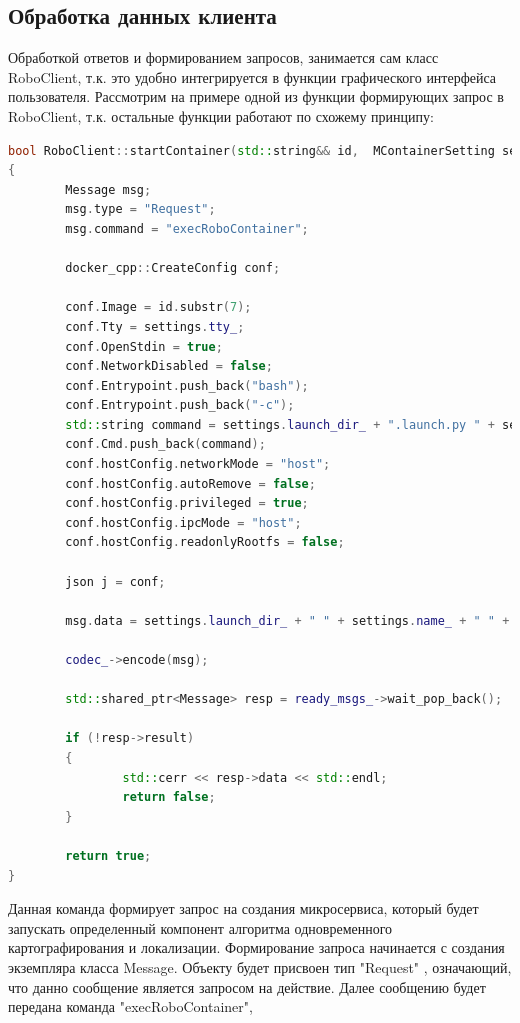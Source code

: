 \documentclass[a4paper, 14pt]{extreport}
\begin{document}
\subsection{Обработка данных клиента}
\par Обработкой ответов и формированием запросов, занимается сам класс RoboClient, т.к. это удобно интегрируется в функции графического 
интерфейса пользователя. Рассмотрим на примере одной из функции формирующих запрос в RoboClient, т.к. остальные функции работают по 
схожему принципу:
\begin{lstlisting}[language=C++, frame=single, xleftmargin=15pt, caption={Определение метода startContainer класса RoboClient},label=DescriptiveLabel]
bool RoboClient::startContainer(std::string&& id,  MContainerSetting settings)
{
        Message msg;
        msg.type = "Request";
        msg.command = "execRoboContainer";

        docker_cpp::CreateConfig conf;

        conf.Image = id.substr(7);
        conf.Tty = settings.tty_;
        conf.OpenStdin = true;
        conf.NetworkDisabled = false;
        conf.Entrypoint.push_back("bash");
        conf.Entrypoint.push_back("-c");
        std::string command = settings.launch_dir_ + ".launch.py " + settings.arguments_;
        conf.Cmd.push_back(command);
        conf.hostConfig.networkMode = "host";
        conf.hostConfig.autoRemove = false;
        conf.hostConfig.privileged = true;
        conf.hostConfig.ipcMode = "host";
        conf.hostConfig.readonlyRootfs = false;

        json j = conf;

        msg.data = settings.launch_dir_ + " " + settings.name_ + " " + j.dump();

        codec_->encode(msg);

        std::shared_ptr<Message> resp = ready_msgs_->wait_pop_back();

        if (!resp->result)
        {
                std::cerr << resp->data << std::endl;
                return false;
        }

        return true;
}
\end{lstlisting}
\par Данная команда формирует запрос на создания микросервиса, который будет запускать определенный компонент алгоритма одновременного 
картографирования и локализации. Формирование запроса начинается с создания экземпляра класса Message. Объекту будет присвоен тип 
"Request" , означающий, что данно сообщение является запросом на действие. Далее сообщению будет передана команда "execRoboContainer",
\end{document}
